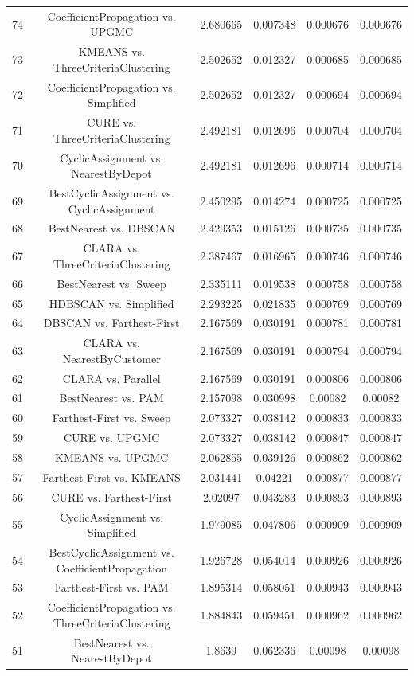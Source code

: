 \documentclass[a4paper,10pt]{article}
\begin{document}
\begin{landscape}
\begin{table}[!htp]
\begin{tabular}{cccccc}
74&CoefficientPropagation vs. UPGMC&2.680665&0.007348&0.000676&0.000676\\
73&KMEANS vs. ThreeCriteriaClustering&2.502652&0.012327&0.000685&0.000685\\
72&CoefficientPropagation vs. Simplified&2.502652&0.012327&0.000694&0.000694\\
71&CURE vs. ThreeCriteriaClustering&2.492181&0.012696&0.000704&0.000704\\
70&CyclicAssignment vs. NearestByDepot&2.492181&0.012696&0.000714&0.000714\\
69&BestCyclicAssignment vs. CyclicAssignment&2.450295&0.014274&0.000725&0.000725\\
68&BestNearest vs. DBSCAN&2.429353&0.015126&0.000735&0.000735\\
67&CLARA vs. ThreeCriteriaClustering&2.387467&0.016965&0.000746&0.000746\\
66&BestNearest vs. Sweep&2.335111&0.019538&0.000758&0.000758\\
65&HDBSCAN vs. Simplified&2.293225&0.021835&0.000769&0.000769\\
64&DBSCAN vs. Farthest-First&2.167569&0.030191&0.000781&0.000781\\
63&CLARA vs. NearestByCustomer&2.167569&0.030191&0.000794&0.000794\\
62&CLARA vs. Parallel&2.167569&0.030191&0.000806&0.000806\\
61&BestNearest vs. PAM&2.157098&0.030998&0.00082&0.00082\\
60&Farthest-First vs. Sweep&2.073327&0.038142&0.000833&0.000833\\
59&CURE vs. UPGMC&2.073327&0.038142&0.000847&0.000847\\
58&KMEANS vs. UPGMC&2.062855&0.039126&0.000862&0.000862\\
57&Farthest-First vs. KMEANS&2.031441&0.04221&0.000877&0.000877\\
56&CURE vs. Farthest-First&2.02097&0.043283&0.000893&0.000893\\
55&CyclicAssignment vs. Simplified&1.979085&0.047806&0.000909&0.000909\\
54&BestCyclicAssignment vs. CoefficientPropagation&1.926728&0.054014&0.000926&0.000926\\
53&Farthest-First vs. PAM&1.895314&0.058051&0.000943&0.000943\\
52&CoefficientPropagation vs. ThreeCriteriaClustering&1.884843&0.059451&0.000962&0.000962\\
51&BestNearest vs. NearestByDepot&1.8639&0.062336&0.00098&0.00098\\

\end{tabular}
\end{table}
\end{landscape}
\end{document}
